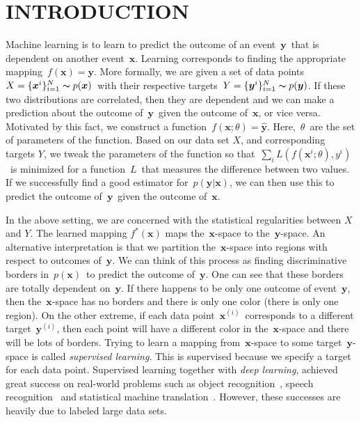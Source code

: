 \documentclass[a4paper,onesided,12pt]{report}
\begin{document}
\begin{abbreviations}
\end{abbreviations}


\chapter{INTRODUCTION}
\label{chapter:introduction}
Machine learning is to learn to predict the outcome of an event~$\boldsymbol{y}$~that is dependent on another event~$\boldsymbol{x}$. Learning corresponds to finding the appropriate mapping~$f(\boldsymbol{x})=\boldsymbol{y}$. More formally, we are given a set of data points~$X=\{\boldsymbol{x}^i\}_{i=1}^{N}\thicksim p(\boldsymbol{x})$~with their respective targets~$Y=\{\boldsymbol{y}^i\}_{i=1}^{N}\thicksim p(\boldsymbol{y})$. If these two distributions are correlated, then they are dependent and we can make a prediction about the outcome of~$\boldsymbol{y}$~given the outcome of~$\boldsymbol{x}$, or vice versa. Motivated by this fact, we construct a function~$f(\boldsymbol{x}; \theta)=\hat{\boldsymbol{y}}$. Here,~$\theta$~are the set of parameters of the function. Based on our data set $X$, and corresponding targets $Y$, we tweak the parameters of the function so that~$\sum_i L(f(\boldsymbol{x}^i; \theta), y^i)$~is minimized for a function~$L$~that measures the difference between two values. If we successfully find a good estimator for~$p(\boldsymbol{y}|\boldsymbol{x})$, we can then use this to predict the outcome of~$\boldsymbol{y}$~given the outcome of~$\boldsymbol{x}$.

In the above setting, we are concerned with the statistical regularities between $X$ and $Y$. The learned mapping $f^{*}(\boldsymbol{x})$ maps the~$\boldsymbol{x}$-space to the~$\boldsymbol{y}$-space. An alternative interpretation is that we partition the~$\boldsymbol{x}$-space into regions with respect to outcomes of~$\boldsymbol{y}$. We can think of this process as finding discriminative borders in~$p(\boldsymbol{x})$~to predict the outcome of~$\boldsymbol{y}$. One can see that these borders are totally dependent on~$\boldsymbol{y}$. If there happens to be only one outcome of event~$\boldsymbol{y}$, then the~$\boldsymbol{x}$-space has no borders and there is only one color (there is only one region). On the other extreme, if each data point~$\boldsymbol{x}^{(i)}$~corresponds to a different target~$\boldsymbol{y}^{(i)}$, then each point will have a different color in the~$\boldsymbol{x}$-space and there will be lots of borders. Trying to learn a mapping from~$\boldsymbol{x}$-space to some target~$\boldsymbol{y}$-space is called \emph{supervised learning}. This is supervised because we specify a target for each data point. Supervised learning together with \emph{deep learning}, achieved great success on real-world problems such as object recognition~\cite{alexnet}, speech recognition~\cite{acoustic} and statistical machine translation~\cite{seq2seq}. However, these successes are heavily due to labeled large data sets.
\end{document}
